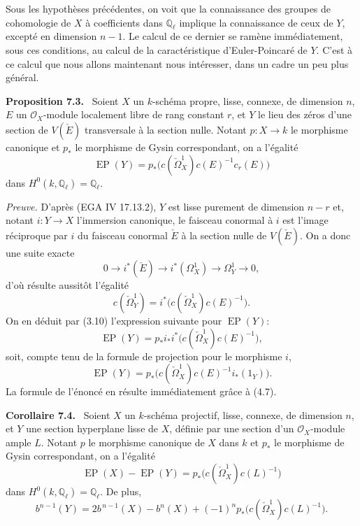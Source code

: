 \documentclass[11pt]{article}
\newenvironment{statement}[1]{\par\medskip\noindent\textbf{#1.}\ }{\par\medskip}
\begin{document}
Sous les hypothèses précédentes, on voit que la connaissance des groupes de cohomologie de $X$ à coefficients dans $\mathbb Q_\ell$ implique la connaissance de ceux de $Y$, excepté en dimension $n-1$. Le calcul de ce dernier se ramène immédiatement, sous ces conditions, au calcul de la caractéristique d'Euler-Poincaré de $Y$. C'est à ce calcul que nous allons maintenant nous intéresser, dans un cadre un peu plus général.

\begin{statement}{Proposition 7.3}
Soient $X$ un $k$-schéma propre, lisse, connexe, de dimension $n$, $E$ un $\mathcal O_X$-module localement libre de rang constant $r$, et $Y$ le lieu des zéros d'une section de $V(\check E)$ transversale à la section nulle. Notant $p:X\to k$ le morphisme canonique et $p_*$ le morphisme de Gysin correspondant, on a l'égalité
\[
\operatorname{EP}(Y)=p_*\bigl(c(\check\Omega_X^1)c(E)^{-1}c_r(E)\bigr)
\]
dans $H^0(k,\mathbb Q_\ell)=\mathbb Q_\ell$.
\end{statement}

\emph{Preuve.} D'après (EGA IV 17.13.2), $Y$ est lisse purement de dimension $n-r$ et, notant $i:Y\to X$ l'immersion canonique, le faisceau conormal à $i$ est l'image réciproque par $i$ du faisceau conormal $\check E$ à la section nulle de $V(\check E)$. On a donc une suite exacte
\[
0\to i^*(\check E)\to i^*(\Omega_X^1)\to\Omega_Y^1\to0,
\tag{7.3.1}
\]
d'où résulte aussitôt l'égalité
\[
c(\check\Omega_Y^1)=i^*\bigl(c(\check\Omega_X^1)c(E)^{-1}\bigr).
\tag{7.3.2}
\]
On en déduit par (3.10) l'expression suivante pour $\operatorname{EP}(Y)$:
\[
\operatorname{EP}(Y)=p_*i_*i^*\bigl(c(\check\Omega_X^1)c(E)^{-1}\bigr),
\]
soit, compte tenu de la formule de projection pour le morphisme $i$,
\[
\operatorname{EP}(Y)=p_*\bigl(c(\check\Omega_X^1)c(E)^{-1}i_*(1_Y)\bigr).
\]
La formule de l'énoncé en résulte immédiatement grâce à (4.7).

\begin{statement}{Corollaire 7.4}
Soient $X$ un $k$-schéma projectif, lisse, connexe, de dimension $n$, et $Y$ une section hyperplane lisse de $X$, définie par une section d'un $\mathcal O_X$-module ample $L$. Notant $p$ le morphisme canonique de $X$ dans $k$ et $p_*$ le morphisme de Gysin correspondant, on a l'égalité
\[
\operatorname{EP}(X)-\operatorname{EP}(Y)=p_*\bigl(c(\check\Omega_X^1)c(L)^{-1}\bigr)
\tag{7.4.1}
\]
dans $H^0(k,\mathbb Q_\ell)=\mathbb Q_\ell$. De plus,
\[
b^{n-1}(Y)=2b^{\,n-1}(X)-b^n(X)+(-1)^n p_*\bigl(c(\check\Omega_X^1)c(L)^{-1}\bigr).
\tag{7.4.2}
\]
\end{statement}
\end{document}
